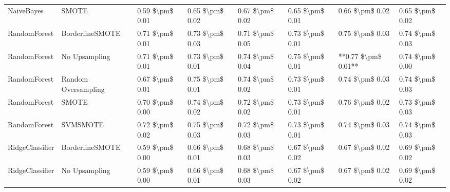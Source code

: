 \begin{tabular}{llllllll}
                     NaiveBayes &                         SMOTE & 0.59 \$\textbackslash pm\$ 0.01 &           0.65 \$\textbackslash pm\$ 0.02 &       0.67 \$\textbackslash pm\$ 0.02 &        0.65 \$\textbackslash pm\$ 0.01 &                         0.66 \$\textbackslash pm\$ 0.02 & 0.65 \$\textbackslash pm\$ 0.02 \\
                   RandomForest &               BorderlineSMOTE & 0.71 \$\textbackslash pm\$ 0.01 &           0.73 \$\textbackslash pm\$ 0.03 &       0.71 \$\textbackslash pm\$ 0.05 &        0.73 \$\textbackslash pm\$ 0.01 &                         0.75 \$\textbackslash pm\$ 0.03 & 0.74 \$\textbackslash pm\$ 0.03 \\
                   RandomForest &                 No Upsampling & 0.71 \$\textbackslash pm\$ 0.01 &           0.73 \$\textbackslash pm\$ 0.01 &       0.74 \$\textbackslash pm\$ 0.04 &        0.75 \$\textbackslash pm\$ 0.01 &                     **0.77 \$\textbackslash pm\$ 0.01** & 0.74 \$\textbackslash pm\$ 0.00 \\
                   RandomForest &           Random Oversampling & 0.67 \$\textbackslash pm\$ 0.01 &           0.75 \$\textbackslash pm\$ 0.01 &       0.74 \$\textbackslash pm\$ 0.02 &        0.73 \$\textbackslash pm\$ 0.01 &                         0.74 \$\textbackslash pm\$ 0.03 & 0.74 \$\textbackslash pm\$ 0.03 \\
                   RandomForest &                         SMOTE & 0.70 \$\textbackslash pm\$ 0.00 &           0.74 \$\textbackslash pm\$ 0.02 &       0.72 \$\textbackslash pm\$ 0.02 &        0.73 \$\textbackslash pm\$ 0.01 &                         0.76 \$\textbackslash pm\$ 0.02 & 0.73 \$\textbackslash pm\$ 0.03 \\
                   RandomForest &                      SVMSMOTE & 0.72 \$\textbackslash pm\$ 0.02 &           0.75 \$\textbackslash pm\$ 0.03 &       0.72 \$\textbackslash pm\$ 0.03 &        0.73 \$\textbackslash pm\$ 0.01 &                         0.74 \$\textbackslash pm\$ 0.03 & 0.74 \$\textbackslash pm\$ 0.03 \\
                RidgeClassifier &               BorderlineSMOTE & 0.59 \$\textbackslash pm\$ 0.00 &           0.66 \$\textbackslash pm\$ 0.01 &       0.68 \$\textbackslash pm\$ 0.03 &        0.67 \$\textbackslash pm\$ 0.02 &                         0.67 \$\textbackslash pm\$ 0.02 & 0.69 \$\textbackslash pm\$ 0.02 \\
                RidgeClassifier &                 No Upsampling & 0.59 \$\textbackslash pm\$ 0.00 &           0.66 \$\textbackslash pm\$ 0.01 &       0.68 \$\textbackslash pm\$ 0.03 &        0.67 \$\textbackslash pm\$ 0.02 &                         0.67 \$\textbackslash pm\$ 0.02 & 0.69 \$\textbackslash pm\$ 0.02 \\

\end{tabular}

